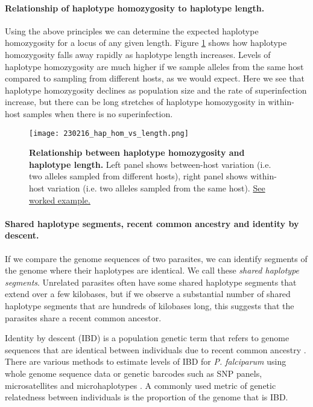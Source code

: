 \documentclass[_main.tex]{subfiles}
\begin{document}

\paragraph{Relationship of haplotype homozygosity to haplotype length.}  Using the above principles we can determine the expected haplotype homozygosity for a locus of any given length.   Figure \ref{fig:main_hap_hom_vs_length} shows how haplotype homozygosity falls away rapidly as haplotype length increases.  Levels of haplotype homozygosity are much higher if we sample alleles from the same host compared to sampling from different hosts, as we would expect.  Here we see that haplotype homozygosity declines as population size and the rate of superinfection increase, but there can be long stretches of haplotype homozygosity in within-host samples when there is no superinfection. 

\begin{figure}[h!]
\centering
\texttt{[image: 230216\_hap\_hom\_vs\_length.png]}
\caption{\textbf{Relationship between haplotype homozygosity and haplotype length.} Left panel shows between-host variation (i.e. two alleles sampled from different hosts), right panel shows within-host variation (i.e. two alleles sampled from the same host).  \href{https://d-kwiat.github.io/gtg/haplotype-homozygosity.html}{See worked example.}
}
\label{fig:main_hap_hom_vs_length}
\end{figure}


\paragraph{Shared haplotype segments, recent common ancestry and identity by descent.}  \label{main_shs_ancestry}

If we compare the genome sequences of two parasites, we can identify segments of the genome where their haplotypes are identical.  We call these \textit{shared haplotype segments}.  Unrelated parasites often have some shared haplotype segments that extend over a few kilobases, but if we observe a substantial number of shared haplotype segments that are hundreds of kilobases long, this suggests that the parasites share a recent common ancestor. 

Identity by descent (IBD) is a population genetic term that refers to genome sequences that are identical between individuals due to recent common ancestry \cite{Browning2012}.  There are various methods to estimate levels of IBD for \textit{P. falciparum} using whole genome sequence data \cite{Schaffner2018,Henden2018} or genetic barcodes such as SNP panels, microsatellites and microhaplotypes \cite{Taylor2017,Taylor2019,Taylor2020,Gerlovina2022}.  A commonly used metric of genetic relatedness between individuals is the proportion of the genome that is IBD. 
\end{document}
